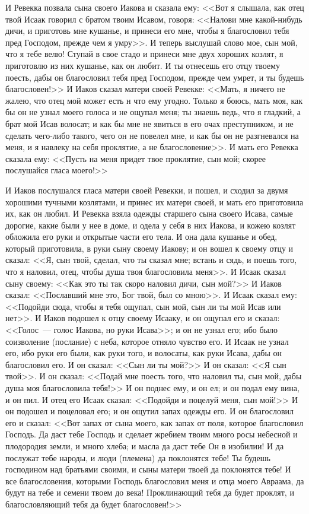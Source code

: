 И Ревекка позвала сына своего Иакова и сказала
ему: <<Вот я слышала, как отец твой Исаак говорил
с братом твоим Исавом, говоря: <<Налови мне
какой-нибудь дичи, и приготовь мне кушанье, и
принеси его мне, чтобы я благословил тебя пред
Господом, прежде чем я умру>>. И теперь выслушай
слово мое, сын мой, что я тебе велю! Ступай в свое
стадо и принеси мне двух хороших козлят, я
приготовлю из них кушанье, как он любит. И ты
отнесешь его отцу твоему поесть, дабы он
благословил тебя пред Господом, прежде чем умрет,
и ты будешь благословен!>> И Иаков сказал матери
своей Ревекке: <<Мать, я ничего не жалею, что
отец мой может есть н что ему угодно. Только я
боюсь, мать моя, как бы он не узнал моего голоса и
не ощупал меня; ты знаешь ведь, что я гладкий, а
брат мой Исав волосат; и как бы мне не явиться в
его очах преступником, и не сделать чего-либо
такого, чего он не повелел мне, и как бы он не
разгневался на меня, и я навлеку на себя
проклятие, а не благословение>>. И мать его
Ревекка сказала ему: <<Пусть на меня придет твое
проклятие, сын мой; скорее послушайся гласа
моего!>>

И Иаков послушался гласа матери своей Ревекки,
и пошел, и сходил за двумя хорошими тучными
козлятами, и принес их матери своей, и мать его
приготовила их, как он любил. И Ревекка взяла
одежды старшего сына своего Исава, самые дорогие,
какие были у нее в доме, и одела у себя в них
Иакова, и кожею козлят обложила его руки и
открытые части его тела. И она дала кушанье и
обед, который приготовила, в руки сыну своему
Иакову; и он вошел к своему отцу и сказал: <<Я,
сын твой, сделал, что ты сказал мне; встань и сядь,
и поешь того, что я наловил, отец, чтобы душа твоя
благословила меня>>. И Исаак сказал сыну своему:
<<Как это ты так скоро наловил дичи, сын мой?>>
И Иаков сказал: <<Пославший мне это, Бог твой,
был со мною>>. И Исаак сказал ему: <<Подойди
сюда, чтобы я тебя ощупал, сын мой, сын ли ты мой
Исав или нет>>. И Иаков подошел к отцу своему
Исааку, и он ощупал его и сказал: <<Голос~--- голос
Иакова, но руки Исава>>; и он не узнал его; ибо
было соизволение (послание) с неба, которое
отняло чувство его. И Исаак не узнал его, ибо руки
его были, как руки того, и волосаты, как руки
Исава, дабы он благословил его. И он сказал:
<<Сын ли ты мой?>> И он сказал: <<Я сын твой>>.
И он сказал: <<Подай мне поесть того, что наловил
ты, сын мой, дабы душа моя благословила тебя!>> И
он поднес ему, и он ел; и он подал ему вина, и он
пил. И отец его Исаак сказал: <<Подойди и поцелуй
меня, сын мой!>> И он подошел и поцеловал его; и
он ощутил запах одежды его. И он благословил его и
сказал: <<Вот запах от сына моего, как запах от
поля, которое благословил Господь. Да даст тебе
Господь и сделает жребием твоим много росы
небесной и плодородия земли, и много хлеба; и
масла да даст тебе Он в изобилии! И да послужат
тебе народы, и люди (племена) да поклонятся тебе!
Ты будешь господином над братьями своими, и сыны
матери твоей да поклонятся тебе! И все
благословения, которыми Господь благословил
меня и отца моего Авраама, да будут на тебе и
семени твоем до века! Проклинающий тебя да будет
проклят, и благословляющий тебя да будет
благословен!>>

